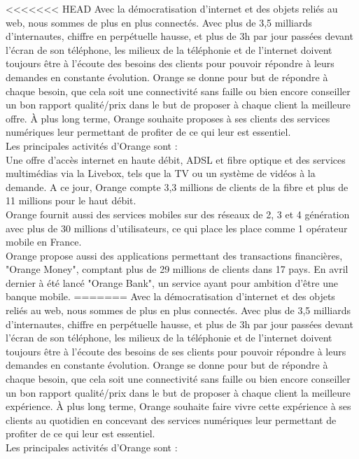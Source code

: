 <<<<<<< HEAD
Avec la démocratisation d'internet et des objets reliés au web, nous sommes de plus en plus connectés. Avec plus de 3,5 milliards d'internautes, chiffre en perpétuelle hausse, et plus de 3h par jour passées devant l'écran de son téléphone, les milieux de la téléphonie et de l'internet doivent toujours être à l'écoute des besoins des clients pour pouvoir répondre à leurs demandes en constante évolution. Orange se donne pour but de répondre à chaque besoin, que cela soit une connectivité sans faille ou bien encore conseiller un bon rapport qualité/prix dans le but de proposer à chaque client la meilleure offre. À plus long terme, Orange souhaite proposes à ses clients des services numériques leur permettant de profiter de ce qui leur est essentiel. \\
Les principales activités d'Orange sont :\\
Une offre d'accès internet en haute débit, ADSL et fibre optique et des services multimédias via la Livebox, tels que la TV ou un système de vidéos à la demande. A ce jour, Orange compte 3,3 millions de clients de la fibre et plus de 11 millions pour le haut débit.\\
Orange fournit aussi des services mobiles sur des réseaux de 2, 3 et 4 génération avec plus de 30 millions d'utilisateurs, ce qui place les place comme 1 opérateur mobile en France.\\
Orange propose aussi des applications permettant des transactions financières, "Orange Money", comptant plus de 29 millions de clients dans 17 pays. En avril dernier à été lancé "Orange Bank", un service ayant pour ambition d'être une banque mobile.
=======
Avec la démocratisation d'internet et des objets reliés au web, nous sommes de plus en plus connectés. Avec plus de 3,5 milliards d'internautes, chiffre en perpétuelle hausse, et plus de 3h par jour passées devant l'écran de son téléphone, les milieux de la téléphonie et de l'internet doivent toujours être à l'écoute des besoins de ses clients pour pouvoir répondre à leurs demandes en constante évolution. Orange se donne pour but de répondre à chaque besoin, que cela soit une connectivité sans faille ou bien encore conseiller un bon rapport qualité/prix dans le but de proposer à chaque client la meilleure expérience. À plus long terme, Orange souhaite faire vivre cette expérience à ses clients au quotidien en concevant des services numériques leur permettant de profiter de ce qui leur est essentiel. \\
Les principales activités d'Orange sont :\\

